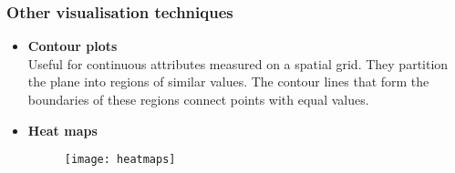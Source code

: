 \subsubsection{Other visualisation techniques}
\begin{itemize}
\item \textbf{Contour plots}\\
Useful for continuous attributes measured on a spatial grid. They partition the plane into regions of similar values. The contour lines that form the boundaries of these regions connect points with equal values.
\item \textbf{Heat maps}\\
\begin{figure}[H]
 \centering
 \texttt{[image: heatmaps]}
\end{figure}
\end{itemize}
